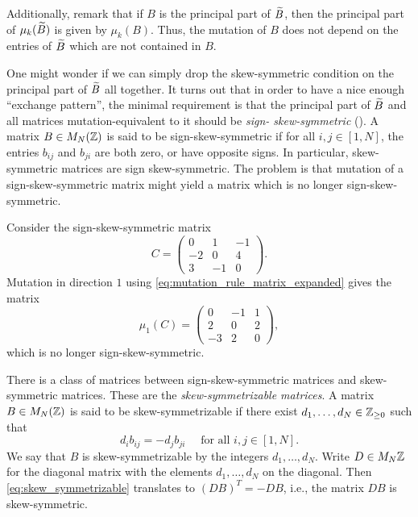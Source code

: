 Additionally, remark that if $B$ is the principal part of $\widetilde{B}$, then the principal
part of $\mu_k(\widetilde{B})$ is given by $\mu_k(B)$. Thus, the mutation of $B$ does not depend
on the entries of $\widetilde{B}$ which are not contained in $B$.

One might wonder if we can simply drop the skew-symmetric condition on the principal
part of $\widetilde{B}$ all together. It turns out that in order to have a nice enough ``exchange
pattern'', the minimal requirement is that the principal part of $\widetilde{B}$ and all matrices
mutation-equivalent to it should be \emph{sign-
	skew-symmetric}
(\cite[Proposition 4.3]{FominZelevinsky2002CAF}). A matrix $B \in M_N(\mathbb{Z})$ is said to
be sign-skew-symmetric if for all $i,j \in [1, N]$, the entries $b_{ij}$ and $b_{ji}$
are both zero, or have opposite signs. In particular, skew-symmetric matrices are sign
skew-symmetric. The problem is that mutation of a sign-skew-symmetric matrix might
yield a matrix which is no longer sign-skew-symmetric.

\begin{example}
	Consider the sign-skew-symmetric matrix
	\begin{equation*}
		C = \begin{pmatrix}
			0  & 1  & -1 \\
			-2 & 0  & 4  \\
			3  & -1 & 0
		\end{pmatrix}.
	\end{equation*}
	Mutation in direction $1$ using \cref{eq:mutation_rule_matrix_expanded} gives the
	matrix
	\begin{equation*}
		\mu_1(C) = \begin{pmatrix}
			0  & -1 & 1 \\
			2  & 0  & 2 \\
			-3 & 2  & 0
		\end{pmatrix},
	\end{equation*}
	which is no longer sign-skew-symmetric.
\end{example}

There is a class of matrices between sign-skew-symmetric matrices and skew-symmetric
matrices. These are the \emph{skew-symmetrizable
	matrices}. A matrix $B \in M_N(\mathbb{Z})$ is said to be
skew-symmetrizable if there exist $d_1, \dots, d_N \in \mathbb{Z}_{\geq 0}$ such that
\begin{equation}\label{eq:skew_symmetrizable}
	d_i b_{ij} = -d_j b_{ji}\quad  \text{ for all } i,j \in [1, N].
\end{equation}
%
We say that $B$ is skew-symmetrizable by the integers $d_1, \dots, d_N$. Write $D \in
	M_N{\mathbb{Z}}$ for the diagonal matrix with the elements $d_1, \dots, d_N$ on the diagonal.
Then \cref{eq:skew_symmetrizable} translates to $(DB)^T = -DB$, i.e., the matrix $DB$
is skew-symmetric.

